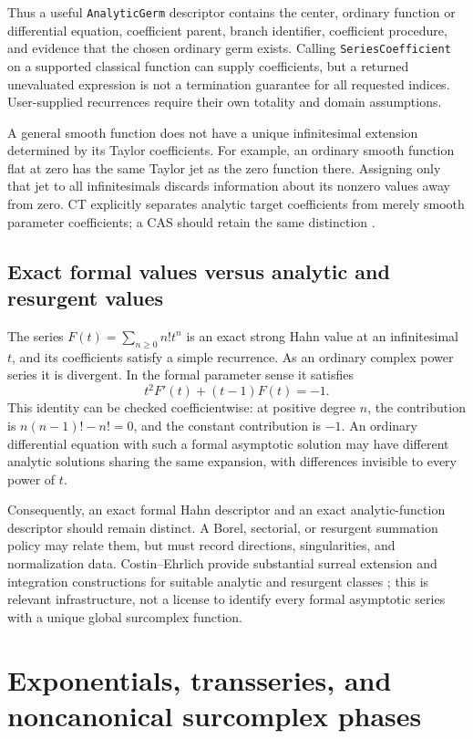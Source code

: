 \documentclass[11pt,letterpaper]{article}
\theoremstyle{definition}\newtheorem{definition}[theorem]{Definition}
\theoremstyle{remark}\newtheorem{remark}[theorem]{Remark}
\newcommand{\code}[1]{\texttt{#1}}
\numberwithin{equation}{section}\setcounter{tocdepth}{2}
\begin{document}
Thus a useful \code{AnalyticGerm} descriptor contains the center, ordinary function or differential equation, coefficient parent, branch identifier, coefficient procedure, and evidence that the chosen ordinary germ exists. Calling \code{SeriesCoefficient} on a supported classical function can supply coefficients, but a returned unevaluated expression is not a termination guarantee for all requested indices. User-supplied recurrences require their own totality and domain assumptions.

A general smooth function does not have a unique infinitesimal extension determined by its Taylor coefficients. For example, an ordinary smooth function flat at zero has the same Taylor jet as the zero function there. Assigning only that jet to all infinitesimals discards information about its nonzero values away from zero. CT explicitly separates analytic target coefficients from merely smooth parameter coefficients; a CAS should retain the same distinction \cite{CT}.

\subsection{Exact formal values versus analytic and resurgent values}
The series $F(t)=\sum_{n\ge0}n!t^n$ is an exact strong Hahn value at an infinitesimal $t$, and its coefficients satisfy a simple recurrence. As an ordinary complex power series it is divergent. In the formal parameter sense it satisfies
\[
 t^2 F'(t)+(t-1)F(t)=-1.
\]
This identity can be checked coefficientwise: at positive degree $n$, the contribution is $n(n-1)!-n!=0$, and the constant contribution is $-1$. An ordinary differential equation with such a formal asymptotic solution may have different analytic solutions sharing the same expansion, with differences invisible to every power of $t$.

Consequently, an exact formal Hahn descriptor and an exact analytic-function descriptor should remain distinct. A Borel, sectorial, or resurgent summation policy may relate them, but must record directions, singularities, and normalization data. Costin--Ehrlich provide substantial surreal extension and integration constructions for suitable analytic and resurgent classes \cite{CE}; this is relevant infrastructure, not a license to identify every formal asymptotic series with a unique global surcomplex function.

\section{Exponentials, transseries, and noncanonical surcomplex phases}\label{sec:transseries}
\end{document}
